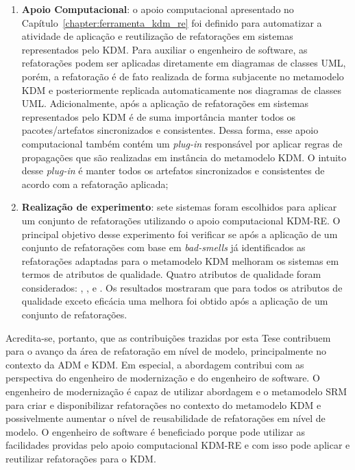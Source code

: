 \begin{enumerate}
\item \textbf{Apoio Computacional}: o apoio computacional apresentado no Capítulo~\ref{chapter:ferramenta_kdm_re} foi definido para automatizar a atividade de aplicação e reutilização de refatorações em sistemas representados pelo KDM. Para auxiliar o engenheiro de software, as refatorações podem ser aplicadas diretamente em diagramas de classes UML, porém, a refatoração é de fato realizada de forma subjacente no metamodelo KDM e posteriormente replicada automaticamente nos diagramas de classes UML. Adicionalmente, após a aplicação de refatorações em sistemas representados pelo KDM é de suma importância manter todos os pacotes/artefatos sincronizados e consistentes. Dessa forma, esse apoio computacional também contém um \textit{plug-in} responsável por aplicar regras de propagações que são realizadas em instância do metamodelo KDM. O intuito desse \textit{plug-in} é manter todos os artefatos sincronizados e consistentes de acordo com a refatoração aplicada;

\item \textbf{Realização de experimento}: sete sistemas foram escolhidos para aplicar um conjunto de refatorações utilizando o apoio computacional KDM-RE. O principal objetivo desse experimento foi verificar se após a aplicação de um conjunto de refatorações com base em \textit{bad-smells} já identificados as refatorações adaptadas para o metamodelo KDM melhoram os sistemas em termos de atributos de qualidade. Quatro atributos de qualidade foram considerados: , ,  e . Os resultados mostraram que para todos os atributos de qualidade exceto eficácia uma melhora foi obtido após a aplicação de um conjunto de refatorações.

\end{enumerate}

Acredita-se, portanto, que as contribuições trazidas por esta Tese contribuem para o avanço da área de refatoração em nível de modelo, principalmente no contexto da ADM e KDM. Em especial, a abordagem contribui com as perspectiva do engenheiro de modernização e do engenheiro de software. O engenheiro de modernização é capaz de utilizar abordagem e o metamodelo SRM para criar e disponibilizar refatorações no contexto do metamodelo KDM e possivelmente aumentar o nível de reusabilidade de refatorações em nível de modelo. O engenheiro de software é beneficiado porque pode utilizar as facilidades providas pelo apoio computacional KDM-RE e com isso pode aplicar e reutilizar refatorações para o KDM.


